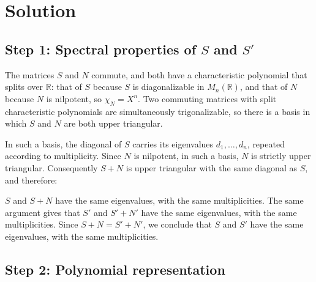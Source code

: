 \documentclass{article}
\begin{document}
\section{Solution}

\subsection{Step 1: Spectral properties of \( S \) and \( S' \)}

The matrices \( S \) and \( N \) commute, and both have a characteristic polynomial that
splits over \( \mathbb{R} \): that of \( S \) because \( S \) is diagonalizable in
\( M_n(\mathbb{R}) \), and that of \( N \) because \( N \) is nilpotent, so
\( \chi_N = X^n \). Two commuting matrices with split characteristic polynomials are
simultaneously trigonalizable, so there is a basis in which \( S \) and \( N \) are both
upper triangular.

In such a basis, the diagonal of \( S \) carries its eigenvalues \( d_1, \dots, d_n \),
repeated according to multiplicity. Since \( N \) is nilpotent, in such a basis, \( N \) is strictly upper triangular. Consequently \( S + N \) is upper
triangular with the same diagonal as \( S \), and therefore:

\( S \) and \( S + N \) have the same eigenvalues, with the same
multiplicities. The same argument gives that \( S' \) and \( S' + N' \) have the same eigenvalues, with the same
multiplicities. Since
\( S + N = S' + N' \), we conclude that  \( S \) and \( S' \)
have the same eigenvalues, with the same multiplicities.

\subsection{Step 2: Polynomial representation}
\end{document}
